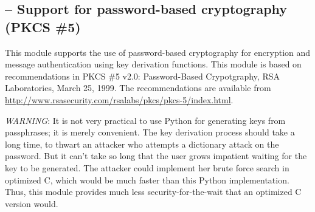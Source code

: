 \documentclass{howto}
\begin{document}
\subsection{
	-- Support for password-based cryptography (PKCS \#5)}

This module supports the use of password-based cryptography for
encryption and message authentication using key derivation
functions.  This module is based on recommendations in PKCS \#5 v2.0:
Password-Based Crypotgraphy, RSA Laboratories, March 25, 1999.
The recommendations are available from
\url{http://www.rsasecurity.com/rsalabs/pkcs/pkcs-5/index.html}.

\emph{WARNING}: It is not very practical to use Python for generating
keys from passphrases; it is merely convenient.  The key derivation
process should take a long time, to thwart an attacker who attempts a
dictionary attack on the password.  But it can't take so long that the
user grows impatient waiting for the key to be generated.  The
attacker could implement her brute force search in optimized C, which
would be much faster than this Python implementation.  Thus, this
module provides much less security-for-the-wait that an optimized C
version would.
\end{document}
